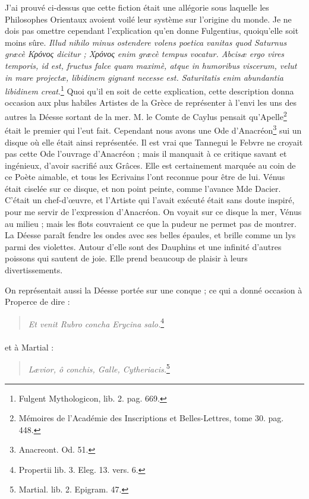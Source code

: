 \documentclass[a4paper, 18pt, oneside]{article}
\begin{document}
J'ai prouvé ci-dessus que cette fiction était une allégorie sous laquelle les Philosophes Orientaux avoient voilé leur système sur l'origine du monde. Je ne dois pas omettre cependant l'explication qu'en donne Fulgentius, quoiqu'elle soit moins sûre. \emph{Illud nihilo minus ostendere volens poetica vanitas quod Saturnus græcè Κρόνος dicitur ; Χρόνος enim græcè tempus vocatur. Abcisæ ergo vires temporis, id est, fructus falce quam maximè, atque in humoribus viscerum, velut in mare projectæ, libidinem gignant necesse est. Saturitatis enim abundantia libidinem creat}.\footnote{Fulgent Mythologicon, lib. 2. pag. 669.} Quoi qu'il en soit de cette explication, cette description donna occasion aux plus habiles Artistes de la Grèce de représenter à l'envi les uns des autres la Déesse sortant de la mer. M. le Comte de Caylus pensait qu'Apelle\footnote{Mémoires de l'Académie des Inscriptions et Belles-Lettres, tome 30. pag. 448.} était le premier qui l'eut fait. Cependant nous avons une Ode d'Anacréon\footnote{Anacreont. Od. 51.} sui un disque où elle était ainsi représentée. Il est vrai que Tannegui le Febvre ne croyait pas cette Ode l'ouvrage d'Anacréon ; mais il manquait à ce critique savant et ingénieux, d'avoir sacrifié aux Grâces. Elle est certainement marquée au coin de ce Poète aimable, et tous les Ecrivains l'ont reconnue pour être de lui. Vénus était ciselée sur ce disque, et non point peinte, comme l'avance Mde Dacier. C'était un chef-d'œuvre, et l'Artiste qui l'avait exécuté était sans doute inspiré, pour me servir de l'expression d'Anacréon. On voyait sur ce disque la mer, Vénus au milieu ; mais les flots couvraient ce que la pudeur ne permet pas de montrer. La Déesse paraît fendre les ondes avec ses belles épaules, et brille comme un lys parmi des violettes. Autour d'elle sont des Dauphins et une infinité d'autres poissons qui sautent de joie. Elle prend beaucoup de plaisir à leurs divertissements.

On représentait aussi la Déesse portée sur une conque ; ce qui a donné occasion à Properce de dire :
\begin{quotation}
\emph{Et venit Rubro concha Erycina salo.}\footnote{Propertii lib. 3. Eleg. 13. vers. 6.}
\end{quotation}
\paragraph{}
et à Martial :
\begin{quotation}
\emph{Lævior, ô conchis, Galle, Cytheriacis.}\footnote{Martial. lib. 2. Epigram. 47.}
\end{quotation}
\end{document}
